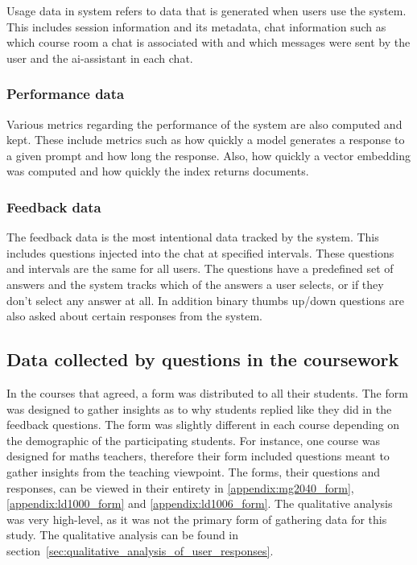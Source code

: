 Usage data in system refers to data that is generated when users use the system. This includes session information and its metadata, chat information such as which course room a chat is associated with and which messages were sent by the user and the ai-assistant in each chat.


\subsubsection{Performance data}


Various metrics regarding the performance of the system are also computed and kept. These include metrics such as how quickly a model generates a response to a given prompt and how long the response. Also, how quickly a vector embedding was computed and how quickly the index returns documents.


\subsubsection{Feedback data}
\label{sec:method_feedback_data}




The feedback data is the most intentional data tracked by the system. This includes questions injected into the chat at specified intervals. These questions and intervals are the same for all users. The questions have a predefined set of answers and the system tracks which of the answers a user selects, or if they don’t select any answer at all. In addition binary thumbs up/down questions are also asked about certain responses from the system.


\subsection{Data collected by questions in the coursework}


In the courses that agreed, a form was distributed to all their students. The form was designed to gather insights as to why students replied like they did in the feedback questions. The form was slightly different in each course depending on the demographic of the participating students. For instance, one course was designed for maths teachers, therefore their form included questions meant to gather insights from the teaching viewpoint. The forms, their questions and responses, can be viewed in their entirety in \autoref{appendix:mg2040_form}, \autoref{appendix:ld1000_form} and \autoref{appendix:ld1006_form}. The qualitative analysis was very high-level, as it was not the primary form of gathering data for this study. The qualitative analysis can be found in section~\ref{sec:qualitative_analysis_of_user_responses}.


